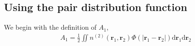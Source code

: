 \documentclass[letterpaper,twocolumn,amsmath,amssymb,pre,aps,10pt]{revtex4-1}
\newcommand\rr{\mathbf{r}}
\newcommand\dd{\mathrm{d}}
\begin{document}



\subsection{Using the pair distribution function}

We begin with the definition of $A_1$,
\begin{align}
  A_1 = \frac{1}{2}\iint n^{(2)}(\rr_1,\rr_2) \Phi(|\rr_1-\rr_2|)
  \dd\rr_1 \dd\rr_2
\end{align}
\end{document}
